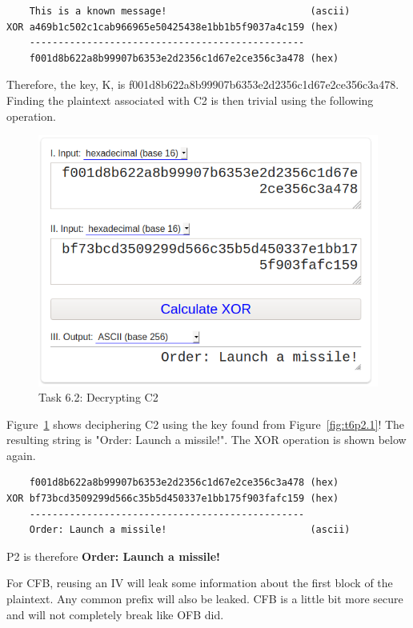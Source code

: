 \documentclass[12pt]{article}
\begin{document}
\begin{verbatim}
    This is a known message!                         (ascii)
XOR a469b1c502c1cab966965e50425438e1bb1b5f9037a4c159 (hex)
    ------------------------------------------------
    f001d8b622a8b99907b6353e2d2356c1d67e2ce356c3a478 (hex)
\end{verbatim}

Therefore, the key, K, is f001d8b622a8b99907b6353e2d2356c1d67e2ce356c3a478. Finding the plaintext associated with C2 is then trivial using the following operation.

\begin{figure}[H]
    \begin{center}
        \includegraphics[scale=0.55]{t6p2.2.png}
    \end{center}{}
    \caption{Task 6.2: Decrypting C2}
    \label{fig:t6p2.2}
\end{figure}

Figure~\ref{fig:t6p2.2} shows deciphering C2 using the key found from Figure~\ref{fig:t6p2.1}! The resulting string is "Order: Launch a missile!". The XOR operation is shown below again.

\begin{verbatim}
    f001d8b622a8b99907b6353e2d2356c1d67e2ce356c3a478 (hex)
XOR bf73bcd3509299d566c35b5d450337e1bb175f903fafc159 (hex)
    ------------------------------------------------
    Order: Launch a missile!                         (ascii)
\end{verbatim}

P2 is therefore \textbf{Order: Launch a missile!}

For CFB, reusing an IV will leak some information about the first block of the plaintext. Any common prefix will also be leaked. CFB is a little bit more secure and will not completely break like OFB did.
\end{document}
